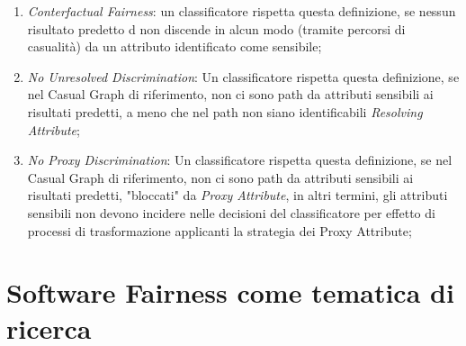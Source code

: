  \begin{enumerate}
     \item \emph{Conterfactual Fairness}: un classificatore rispetta questa definizione, se nessun risultato predetto d non discende in alcun modo (tramite percorsi di casualità) da un attributo identificato come sensibile;
     \item \emph{No Unresolved Discrimination}: Un classificatore rispetta questa definizione, se nel Casual Graph di riferimento, non ci sono path da attributi sensibili ai risultati predetti, a meno che nel path non siano identificabili \textit{Resolving Attribute};
     \item \emph{No Proxy Discrimination}: Un classificatore rispetta questa definizione, se nel Casual Graph di riferimento, non ci sono path da attributi sensibili ai risultati predetti, "bloccati" da \textit{Proxy Attribute}, in altri termini, gli attributi sensibili non devono incidere nelle decisioni del classificatore per effetto di processi di trasformazione applicanti la strategia dei Proxy Attribute;
 \end{enumerate}






\newpage
\section{Software Fairness come tematica di ricerca}



